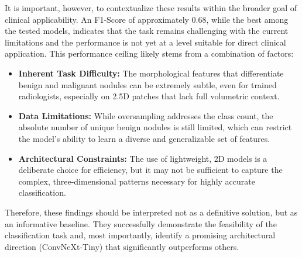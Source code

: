 It is important, however, to contextualize these results within the broader goal of clinical applicability. An F1-Score of approximately 0.68, while the best among the tested models, indicates that the task remains challenging with the current limitations and the performance is not yet at a level suitable for direct clinical application. This performance ceiling likely stems from a combination of factors:
\begin{itemize}
    \item \textbf{Inherent Task Difficulty:} The morphological features that differentiate benign and malignant nodules can be extremely subtle, even for trained radiologists, especially on 2.5D patches that lack full volumetric context.
    \item \textbf{Data Limitations:} While oversampling addresses the class count, the absolute number of unique benign nodules is still limited, which can restrict the model's ability to learn a diverse and generalizable set of features.
    \item \textbf{Architectural Constraints:} The use of lightweight, 2D models is a deliberate choice for efficiency, but it may not be sufficient to capture the complex, three-dimensional patterns necessary for highly accurate classification.
\end{itemize}

Therefore, these findings should be interpreted not as a definitive solution, but as an informative baseline. They successfully demonstrate the feasibility of the classification task and, most importantly, identify a promising architectural direction (ConvNeXt-Tiny) that significantly outperforms others. 
